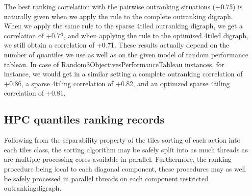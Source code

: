 \documentclass[a4paper,10pt,english]{sphinxhowto}
\begin{document}
\begin{sphinxVerbatim}[commandchars=\\\{\},numbers=left,firstnumber=1,stepnumber=1]
\end{sphinxVerbatim}

The best ranking correlation with the pairwise outranking situations (+0.75) is naturally given when we apply the  rule to the complete outranking digraph. When we apply the same rule to the sparse 4\sphinxhyphen{}tiled outranking digraph, we get a correlation of +0.72, and when applying the  rule to the optimised 4\sphinxhyphen{}tiled digraph, we still obtain a correlation of +0.71. These results actually depend on the number of quantiles we use as well as on the given model of random performance tableau. In case of Random3ObjectivesPerformanceTableau instances, for instance, we would get in a similar setting a complete outranking correlation of +0.86, a sparse 4\sphinxhyphen{}tiling correlation of +0.82, and an optimzed sparse 4\sphinxhyphen{}tiling correlation of +0.81.


\subsection{HPC quantiles ranking records}
\label{\detokenize{tutorial:hpc-quantiles-ranking-records}}
Following from the separability property of the \sphinxhyphen{}tiles sorting of each action into each \sphinxhyphen{}tiles class, the \sphinxhyphen{}sorting algorithm may be safely split into as much threads as are multiple processing cores available in parallel. Furthermore, the ranking procedure being local to each diagonal component, these procedures may as well be safely processed in parallel threads on each component restricted outrankingdigraph.
\end{document}
